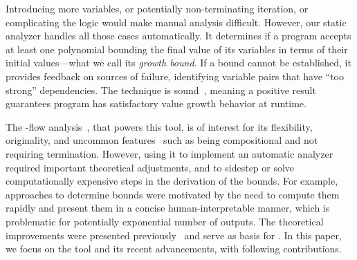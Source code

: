\documentclass[runningheads]{llncs}
\begin{document}
Introducing more variables, or potentially non-terminating iteration, or complicating the logic would make manual analysis difficult.
However, our static analyzer handles all those cases automatically.
It determines if a program accepts at least one polynomial bounding the final value of its variables in terms of their initial values---what we call its \emph{growth bound}.
If a bound cannot be established, it provides feedback on sources of failure, identifying variable pairs that have \enquote{too strong} dependencies.
The technique is sound~\cite[p.~11]{Jones2009}, meaning a positive result guarantees program has satisfactory value growth behavior at runtime.

The \mwp-flow analysis~\cite{Jones2009}, that powers this tool, is of interest for its flexibility, originality, and uncommon features~\cite{Carbonneaux2015} such as being compositional and not requiring termination.
However, using it to implement an automatic analyzer required 
important theoretical adjustments, and 
to sidestep or solve computationally expensive steps in the derivation of the bounds.
For example, approaches to determine bounds were motivated by the need to compute them rapidly and present them in a concise human-interpretable manner, which is problematic for potentially exponential number of outputs.
The theoretical improvements were presented previously~\cite{Aubert2022b} and serve as basis for \pymwp.
In this paper, we focus on the tool and its recent advancements, %
with following contributions.
%
%
\end{document}

